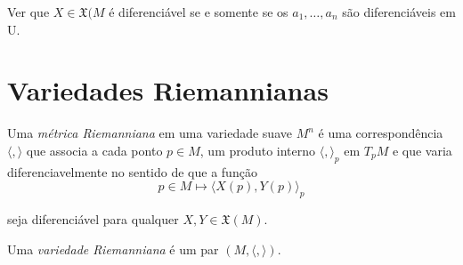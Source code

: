 Ver que $X \in \mathfrak{X}(M$ é diferenciável se e somente se os $a_1, \ldots, a_n$ são diferenciáveis em U.

\section{Variedades Riemannianas}

\begin{defi}
	Uma \emph{métrica Riemanniana} em uma variedade suave $M^n$ é uma correspondência $\langle , \rangle$ que associa a cada ponto $p \in M$, um produto interno $\langle , \rangle_p$ em $T_p M$ e que varia diferenciavelmente no sentido de que a função
	\begin{equation*}
		p \in M \mapsto \langle X(p), Y(p) \rangle_p
	\end{equation*}
	
	seja diferenciável para qualquer $X,Y \in \mathfrak{X}(M)$.
\end{defi}

\begin{defi}
	Uma \emph{variedade Riemanniana} é um par $(M, \langle , \rangle)$.
\end{defi}

